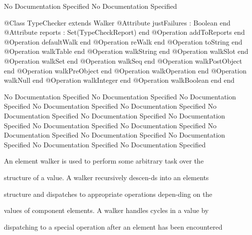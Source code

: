 No Documentation Specified
No Documentation Specified
\begin{Interface}
@Class TypeChecker extends Walker
  @Attribute justFailures : Boolean end
  @Attribute reports : Set(TypeCheckReport) end
  @Operation addToReports end
  @Operation defaultWalk end
  @Operation reWalk end
  @Operation toString end
  @Operation walkTable end
  @Operation walkString end
  @Operation walkSlot end
  @Operation walkSet end
  @Operation walkSeq end
  @Operation walkPostObject end
  @Operation walkPreObject end
  @Operation walkOperation end
  @Operation walkNull end
  @Operation walkInteger end
  @Operation walkBoolean end
end
\end{Interface}
No Documentation Specified
No Documentation Specified
No Documentation Specified
No Documentation Specified
No Documentation Specified
No Documentation Specified
No Documentation Specified
No Documentation Specified
No Documentation Specified
No Documentation Specified
No Documentation Specified
No Documentation Specified
No Documentation Specified
No Documentation Specified
No Documentation Specified

      An element walker is used to perform some arbitrary task over the

      structure of a value. A walker recursively descen-ds into an elements

      structure and dispatches to appropriate operations depen-ding on the

      values of component elements. A walker handles cycles in a value by

      dispatching to a special operation after an element has been encountered

